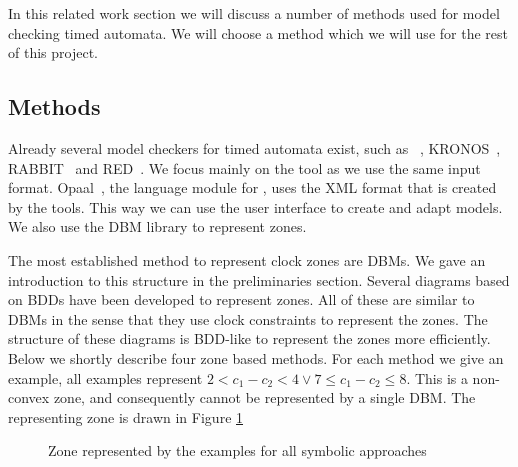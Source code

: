 In this related work section we will discuss a number of methods used for model checking timed automata. We will choose a method which we will use for the rest of this project.

\subsection{Methods}
Already several model checkers for timed automata exist, such as \uppaal{}~\cite{UPPAAL}, KRONOS~\cite{kronos}, RABBIT~\cite{CAV03} and RED~\cite{crds}. We focus mainly on the \uppaal{} tool as we use the same input format. Opaal~\cite{opaal}, the language module for \ltsmin{}, uses the XML format that is created by the \uppaal{} tools. This way we can use the \uppaal{} user interface to create and adapt models. We also use the \uppaal{} DBM library to represent zones.

The most established method to represent clock zones are DBMs. We gave an introduction to this structure in the preliminaries section. Several diagrams based on BDDs have been developed to represent zones. All of these are similar to DBMs in the sense that they use clock constraints to represent the zones. The structure of these diagrams is BDD-like to represent the zones more efficiently. Below we shortly describe four zone based methods. For each method we give an example, all examples represent $2 < c_1 - c_2 < 4 \vee 7 \leq c_1 - c_2 \leq 8$. This is a non-convex zone, and consequently cannot be represented by a single DBM. The representing zone is drawn in Figure \ref{fig:symbolic-example}

\begin{figure}[h]
\centering
{}
\caption{Zone represented by the examples for all symbolic approaches}
\label{fig:symbolic-example}
\end{figure}

